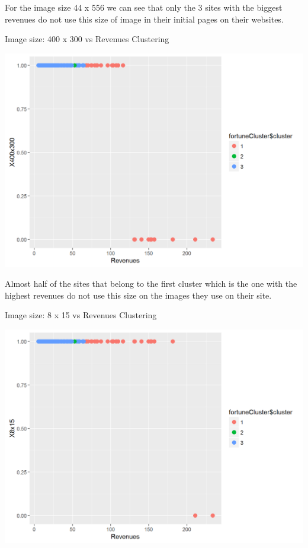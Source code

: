 \documentclass{article}
\begin{document}
For the image size 44 x 556 we can see that only the 3 sites with the biggest revenues do not use this size of image in their initial pages on their websites.
\begin{table}[H]
\centering
\caption{Image size: 400 x 300 vs Revenues Clustering}
\begin{center}
\includegraphics[scale=0.4]{../R/photos/98_clust_400.png}   \\
\end{center}
\end{table}
Almost half of the sites that belong to the first cluster which is the one with the highest revenues do not use this size on the images they use on their site.
\begin{table}[H]
\centering
\caption{Image size: 8 x 15 vs Revenues Clustering}
\begin{center}
\includegraphics[scale=0.4]{../R/photos/99_clust_8x15.png}   \\
\end{center}
\end{table}
\end{document}
